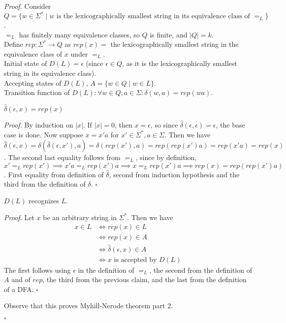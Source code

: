 \documentclass[a4paper]{article}
\newenvironment{proof}{\begin{breakbox}\textit{Proof.}}{\hfill$\square$\end{breakbox}}
\newcommand{\nl}{\vspace{0.2cm}\\}
\newcommand{\hd}{\hat{\delta}}
\begin{document}
\begin{proof}
    Consider $Q = \{w \in \Sigma^* \mid w \text{ is the lexicographically smallest string in its equivalence class of }=_L\}$.\nl
    $=_L$ has finitely many equivalence classes, so $Q$ is finite, and $|Q| = k$.\nl
    Define $rep : \Sigma^* \to Q$ as $rep(x) = $ the lexicographically smallest string in the equivalence class of $x$ under $=_L$.\nl
    Initial state of $D(L) = \epsilon$ (since $\epsilon \in Q$, as it is the lexicographically smallest string in its equivalence class).\nl
    Accepting states of $D(L)$, $A = \{w \in Q \mid w \in L\}$.\nl
    Transition function of $D(L) : \forall w \in Q, a \in \Sigma : \delta(w, a) = rep(wa)$.\nl

    \begin{claim}
        $\hd(\epsilon, x) = rep(x)$
    \end{claim}

    \begin{proof}
        By induction on $|x|$. If $|x| = 0$, then $x = \epsilon$, so since $\hd(\epsilon, \epsilon) = \epsilon$, the base case is done.
        Now suppose $x = x'a$ for $x' \in \Sigma^*, a \in \Sigma$. Then we have $\hd(\epsilon, x) = \delta(\hd(\epsilon, x'), a) = \delta(rep(x'), a) = rep(rep(x')a) = rep(x'a) = rep(x)$. The
        second last equality follows from $=_L$, since by definition, $x' =_L rep(x') \implies x'a =_L rep(x')a \implies x =_L rep(x')a \implies rep(x) = rep(rep(x')a)$.
        First equality from definition of $\hd$, second from induction hypothesis and the third from the definition of $\delta$.
    \end{proof}

    \begin{claim}
        $D(L)$ recognizes $L$.
    \end{claim}

    \begin{proof}
        Let $x$ be an arbitrary string in $\Sigma^*$. Then we have
        \begin{align*}
            x \in L &\iff rep(x) \in L\\
                    &\iff rep(x) \in A\\
                    &\iff \hd(\epsilon, x) \in A\\
                    &\iff x \text{ is accepted by } D(L)
        \end{align*}
        The first follows using $\epsilon$ in the definition of $=_L$, the second from the definition of $A$ and of $rep$, the third from the previous claim, and the last from the
        definition of a DFA.
    \end{proof}

    Observe that this proves Myhill-Nerode theorem part 2.

\end{proof}
\end{document}
